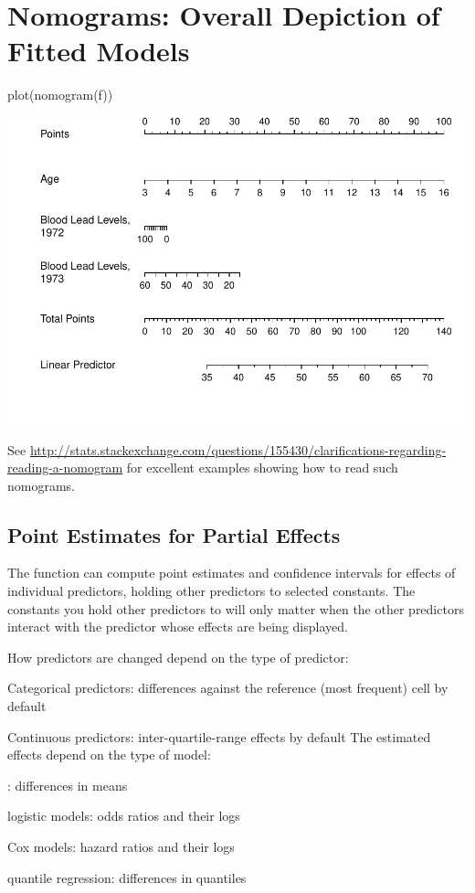 \section{Nomograms: Overall Depiction of Fitted Models} \ipacue
\begin{Schunk}
\begin{Sinput}
plot(nomogram(f))
\end{Sinput}


\centerline{\includegraphics{rmsintro-unnamed-chunk-17-1} }

\end{Schunk}
See
\url{http://stats.stackexchange.com/questions/155430/clarifications-regarding-reading-a-nomogram}
for excellent examples showing how to read such nomograms.

\subsection{Point Estimates for Partial Effects} \ipacue
The  function can compute point estimates and confidence
intervals for effects of individual predictors, holding other
predictors to selected constants.  The constants you hold other
predictors to will only matter when the other predictors interact with
the predictor whose effects are being displayed.

How predictors are changed depend on the type of predictor:
\bi
\item Categorical predictors: differences against the reference (most
  frequent) cell by default
\item Continuous predictors: inter-quartile-range effects by default
\ei
The estimated effects depend on the type of model:
\bi
\item {}: differences in means
\item logistic models: odds ratios and their logs
\item Cox models: hazard ratios and their logs
\item quantile regression: differences in quantiles
\ei

